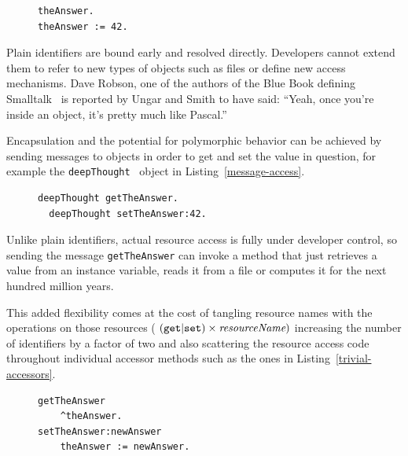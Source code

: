 \documentclass[preprint]{sigplanconf}
\begin{document}
\begin{figure}[htbp]
\begin{lstlisting}[style=numbers,label=variable-lookup,caption=Retrieve and store value via plain identifier.]
theAnswer.
theAnswer := 42.
\end{lstlisting}
\end{figure}

Plain identifiers are bound early and resolved directly.  
Developers cannot extend them to refer to
new types of objects such as files or define new access mechanisms.  Dave Robson, one of the authors
of the Blue Book defining Smalltalk~\cite{Goldberg1983} is reported by Ungar and Smith to have said: ``Yeah, once you're inside an object, it's pretty much like Pascal.''~\cite{Ungar:2007:SEL:1238844.1238853}


Encapsulation and the potential for polymorphic behavior can be achieved by sending 
messages to objects in order to get and set the value in question, for example the
{\tt deepThought}~\cite{adams1997hitchhiker}  object in Listing~\ref{message-access}.  

\begin{figure}[htbp]
\begin{lstlisting}[style=numbers,label=message-access,caption=Retrieve and store value via message sends.]
  deepThought getTheAnswer.
  deepThought setTheAnswer:42.
\end{lstlisting}
\end{figure}

Unlike plain identifiers, actual resource access is fully under developer control, so sending the 
message {\tt getTheAnswer} can invoke a method that just retrieves a value from an instance
variable, reads it from a file or computes it for the next hundred million years.


This added flexibility comes at the cost of tangling resource names with the operations on those
resources (  $({\tt get}|{\tt set}) \times {\mbox{\em resourceName}} ) $ %
increasing the number of identifiers by a factor of two and also scattering the resource access code
throughout individual accessor methods such as the
ones in Listing~\ref{trivial-accessors}.  

\begin{figure}[htbp]
\begin{lstlisting}[style=numbers,label=trivial-accessors,caption=Trivial accessors.]
getTheAnswer
    ^theAnswer.
setTheAnswer:newAnswer
    theAnswer := newAnswer.
\end{lstlisting}
\end{figure}
\end{document}
